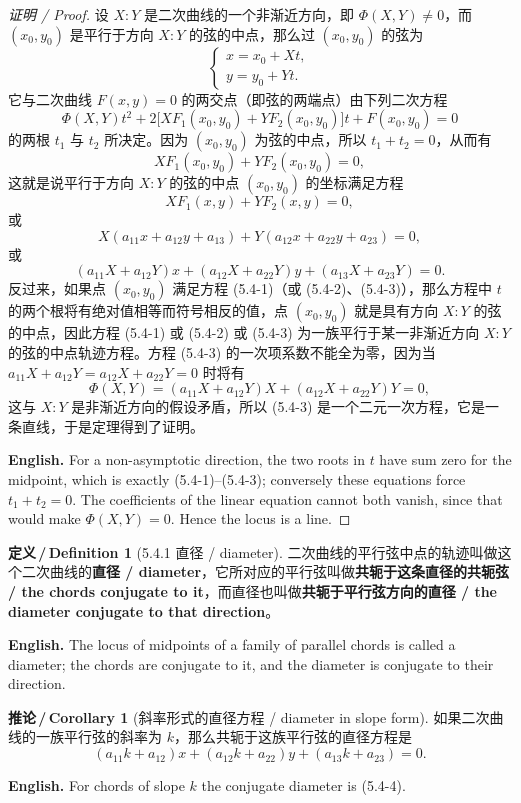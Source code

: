 \documentclass[UTF8,11pt,a4paper]{ctexart}
\newcommand{\EN}[1]{\par\noindent \textbf{English.} #1\par}
\theoremstyle{definition}
\newtheorem*{definition}{定义\,/\,Definition}
\newtheorem*{corollary}{推论\,/\,Corollary}
\begin{document}
\begin{proof}[证明 / Proof]
设 $X:Y$ 是二次曲线的一个非渐近方向，即 $\Phi(X,Y)\ne0$，而 $(x_0,y_0)$ 是平行于方向 $X:Y$ 的弦的中点，那么过 $(x_0,y_0)$ 的弦为
\[
\begin{cases}x=x_0+Xt,\\ y=y_0+Yt.\end{cases}
\]
它与二次曲线 $F(x,y)=0$ 的两交点（即弦的两端点）由下列二次方程
\[
\Phi(X,Y)t^2+2\bigl[XF_1(x_0,y_0)+YF_2(x_0,y_0)\bigr]t+F(x_0,y_0)=0
\]
的两根 $t_1$ 与 $t_2$ 所决定。因为 $(x_0,y_0)$ 为弦的中点，所以 $t_1+t_2=0$，从而有
\[
XF_1(x_0,y_0)+YF_2(x_0,y_0)=0,
\]
这就是说平行于方向 $X:Y$ 的弦的中点 $(x_0,y_0)$ 的坐标满足方程
\[
XF_1(x,y)+YF_2(x,y)=0,\tag{5.4-1}
\]
或
\[
X(a_{11}x+a_{12}y+a_{13})+Y(a_{12}x+a_{22}y+a_{23})=0,\tag{5.4-2}
\]
或
\[
(a_{11}X+a_{12}Y)x+(a_{12}X+a_{22}Y)y+(a_{13}X+a_{23}Y)=0.\tag{5.4-3}
\]
反过来，如果点 $(x_0,y_0)$ 满足方程 (5.4-1)（或 (5.4-2)、(5.4-3)），那么方程中 $t$ 的两个根将有绝对值相等而符号相反的值，点 $(x_0,y_0)$ 就是具有方向 $X:Y$ 的弦的中点，因此方程 (5.4-1) 或 (5.4-2) 或 (5.4-3) 为一族平行于某一非渐近方向 $X:Y$ 的弦的中点轨迹方程。方程 (5.4-3) 的一次项系数不能全为零，因为当 $a_{11}X+a_{12}Y=a_{12}X+a_{22}Y=0$ 时将有
\[
\Phi(X,Y)=(a_{11}X+a_{12}Y)X+(a_{12}X+a_{22}Y)Y=0,
\]
这与 $X:Y$ 是非渐近方向的假设矛盾，所以 (5.4-3) 是一个二元一次方程，它是一条直线，于是定理得到了证明。
\EN{For a non-asymptotic direction, the two roots in $t$ have sum zero for the midpoint, which is exactly (5.4-1)--(5.4-3); conversely these equations force $t_1+t_2=0$. The coefficients of the linear equation cannot both vanish, since that would make $\Phi(X,Y)=0$. Hence the locus is a line.}
\end{proof}

\begin{definition}[5.4.1 直径 / diameter]\label{def:diameter}
二次曲线的平行弦中点的轨迹叫做这个二次曲线的\textbf{直径 / diameter}，它所对应的平行弦叫做\textbf{共轭于这条直径的共轭弦 / the chords conjugate to it}，而直径也叫做\textbf{共轭于平行弦方向的直径 / the diameter conjugate to that direction}。
\EN{The locus of midpoints of a family of parallel chords is called a diameter; the chords are conjugate to it, and the diameter is conjugate to their direction.}
\end{definition}

\begin{corollary}[斜率形式的直径方程 / diameter in slope form]\label{cor:diameter}
如果二次曲线的一族平行弦的斜率为 $k$，那么共轭于这族平行弦的直径方程是
\[
(a_{11}k+a_{12})x+(a_{12}k+a_{22})y+(a_{13}k+a_{23})=0.\tag{5.4-4}
\]
\EN{For chords of slope $k$ the conjugate diameter is (5.4-4).}
\end{corollary}
\end{document}
